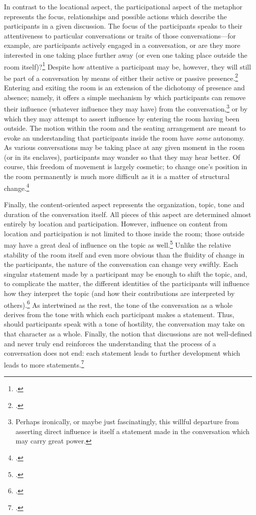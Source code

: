 \documentclass[openany,twoside]{memoir}
\begin{document}
\begin{Spacing}{2}
In contrast to the locational aspect, the participational aspect of the metaphor represents the focus, relationships and possible actions which describe the participants in a given discussion.
The focus of the participants speaks to their attentiveness to particular conversations or traits of those conversations---for example, are participants actively engaged in a conversation, or are they more interested in one taking place further away (or even one taking place outside the room itself)?\footcite{bickford96}
Despite how attentive a participant may be, however, they will still be part of a conversation by means of either their active or passive presence.\footcite{bickford96,giddens86}
Entering and exiting the room is an extension of the dichotomy of presence and absence; namely, it offers a simple mechanism by which participants can remove their influence (whatever influence they may have) from the conversation,\footnote{
Perhaps ironically, or maybe just fascinatingly, this willful departure from asserting direct influence is itself a statement made in the conversation which may carry great power.} 
or by which they may attempt to assert influence by entering the room having been outside.
The motion within the room and the seating arrangement are meant to evoke an understanding that participants inside the room have \emph{some} autonomy.
As various conversations may be taking place at any given moment in the room (or in its enclaves), participants may wander so that they may hear better.
Of course, this freedom of movement is largely cosmetic; to change one's position in the room permanently is much more difficult as it is a matter of structural change.\footcite{giddens86}

Finally, the content-oriented aspect represents the organization, topic, tone and duration of the conversation itself.
All pieces of this aspect are determined almost entirely by location and participation.
However, influence on content from location and participation is not limited to those inside the room; those outside may have a great deal of influence on the topic as well.\footcite[Perhaps, on occasion, more so than those inside? cf.][]{bickford96, giddens86}
Unlike the relative stability of the room itself and even more obvious than the fluidity of change in the participants, the nature of the conversation can change very swiftly.
Each singular statement made by a participant may be enough to shift the topic, and, to complicate the matter, the different identities of the participants will influence how they interpret the topic (and how their contributions are interpreted by others).\footcite{banks91, bickford96}
As intertwined as the rest, the tone of the conversation as a whole derives from the tone with which each participant makes a statement.
Thus, should participants speak with a tone of hostility, the conversation may take on that character as a whole.
Finally, the notion that discussions are not well-defined and never truly end reinforces the understanding that the process of a conversation does not end: each statement leads to further development which leads to more statements.\footcite{schattschneider75, bickford96}


\end{Spacing}
\end{document}
